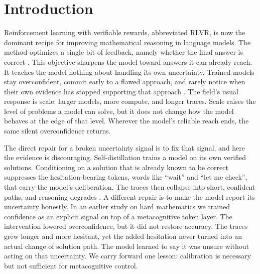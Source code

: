 \section{Introduction}
\label{sec:intro}

Reinforcement learning with verifiable rewards, abbreviated RLVR, is now the
dominant recipe for improving mathematical reasoning in language models. The
method optimizes a single bit of feedback, namely whether the final answer is
correct \citep{shao2024deepseekmath,deepseekr1,zeng2025simplerlzoo,qwen3}. This
objective sharpens the model toward answers it can already reach. It teaches the
model nothing about handling its own uncertainty. Trained models stay
overconfident, commit early to a flawed approach, and rarely notice when their
own evidence has stopped supporting that approach
\citep{huang2024llmcannot,kadavath2022language}. The field's usual response is
scale: larger models, more compute, and longer traces. Scale raises the level of
problems a model can solve, but it does not change how the model behaves at the
edge of that level. Wherever the model's reliable reach ends, the same silent
overconfidence returns.

The direct repair for a broken uncertainty signal is to fix that signal, and
here the evidence is discouraging. Self-distillation trains a model on its own
verified solutions. Conditioning on a solution that is already known to be
correct suppresses the hesitation-bearing tokens, words like ``wait'' and ``let
me check'', that carry the model's deliberation. The traces then collapse into
short, confident paths, and reasoning degrades
\citep{kim2026selfdistill,opd2026rethinking,sdzero2026}. A different repair is to
make the model report its uncertainty honestly. In an earlier study on hard
mathematics we trained confidence as an explicit signal on top of a
metacognitive token layer. The intervention lowered overconfidence, but it did
not restore accuracy. The traces grew longer and more hesitant, yet the added
hesitation never turned into an actual change of solution path. The model
learned to say it was unsure without acting on that uncertainty. We carry
forward one lesson: calibration is necessary but not sufficient for
metacognitive control.

